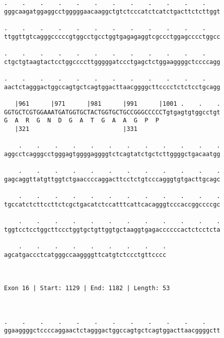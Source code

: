 \documentclass{article}
\begin{document}
\begin{Verbatim}
.    .    .    .    .    .    .    .    .    .    .    .    
gggcaagatggaggcctgggggaacaaggctgtctcccatctcatctgacttctcttggt
                                                            
.    .    .    .    .    .    .    .    .    .    .    .    
ttggttgtcagggcccccgtggcctgcctggtgagagaggtcgccctggagcccctggcc
                                                            
.    .    .    .    .    .    .    .    .    .    .    .    
ctgctgtaagtactcctggccccttgggggatccctgagctctggaaggggctccccagg
                                                            
.    .    .    .    .    .    .    .    .    .    .    .    
aactctagggactggccagtgctcagtggacttaacggggcttcccctctctcctgcagg
                                                            
   |961      |971      |981      |991      |1001 .    .    .
GGTGCTCGTGGAAATGATGGTGCTACTGGTGCTGCCGGGCCCCCTgtgagtgtggcctgt
G  A  R  G  N  D  G  A  T  G  A  A  G  P  P                 
   |321                          |331                       
  
    .    .    .    .    .    .    .    .    .    .    .    .
aggcctcagggcctgggagtggggaggggtctcagtatctgctcttggggctgacaatgg
                                                            
    .    .    .    .    .    .    .    .    .    .    .    .
gagcaggttatgttggtctgaaccccaggacttcctctgtcccagggtgtgacttgcagc
                                                            
    .    .    .    .    .    .    .    .    .    .    .    .
tgccatctcttccttctcgctgacatctccatttcattcacagggtcccaccggccccgc
                                                            
    .    .    .    .    .    .    .    .    .    .    .    .
tggtcctcctggcttccctggtgctgttggtgctaaggtgagaccccccactctcctcta
                                                            
    .    .    .    .    .    .    .    .    .
agcatgaccctcatgggccaaggggttcatgtctccctgttcccc
                                             
                                             
 
Exon 16 | Start: 1129 | End: 1182 | Length: 53



.    .    .    .    .    .    .    .    .    .    .    .    
ggaaggggctccccaggaactctagggactggccagtgctcagtggacttaacggggctt
                                                            

\end{Verbatim}
\end{document}
